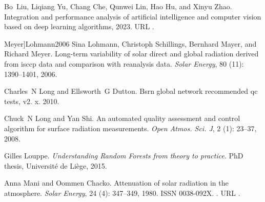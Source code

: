 \documentclass[letterpaper,12pt, twoside]{report}
\providecommand{\DIFdeltex}[1]{{\protect\color{red} \scriptsize #1}} %
\providecommand{\DIFdel}[1]{\texorpdfstring{\DIFdeltex{#1}}{}} %
\begin{document}
\DIFdel{Bo~Liu, Liqiang Yu, Chang Che, Qunwei Lin, Hao Hu, and Xinyu Zhao.
}%
\DIFdel{Integration and performance analysis of artificial intelligence and
  computer vision based on deep learning algorithms, 2023.
}%
\DIFdel{URL }%
\DIFdel{.
}%

  Meyer]{Lohmann2006}
\DIFdel{Sina Lohmann, Christoph Schillings, Bernhard Mayer, and Richard Meyer.
}%
\DIFdel{Long-term variability of solar direct and global radiation derived
  from isccp data and comparison with reanalysis data.
}%
\DIFdel{\emph{Solar Energy}, 80}%
\DIFdel{(11):}%
\DIFdel{1390--1401, 2006.
}%

\DIFdel{Charles~N Long and Ellsworth~G Dutton.
}%
\DIFdel{Bsrn global network recommended qc tests, v2. x.
}%
\DIFdel{2010.
}%

\DIFdel{Chuck~N Long and Yan Shi.
}%
\DIFdel{An automated quality assessment and control algorithm for surface
  radiation measurements.
}%
\DIFdel{\emph{Open Atmos. Sci. J}, 2}%
\DIFdel{(1):}%
\DIFdel{23--37, 2008.
}%

\DIFdel{Gilles Louppe.
}%
\DIFdel{\emph{Understanding Random Forests from theory to practice}.
}%
\DIFdel{PhD thesis, Universit\'e de Li\`ege, 2015.
}%

\DIFdel{Anna Mani and Oommen Chacko.
}%
\DIFdel{Attenuation of solar radiation in the atmosphere.
}%
\DIFdel{\emph{Solar Energy}, 24}%
\DIFdel{(4):}%
\DIFdel{347--349, 1980.
}%
\DIFdel{ISSN 0038-092X.
}%
\DIFdel{.
}%
\DIFdel{URL
  }%
\DIFdel{.
}%
\end{document}
